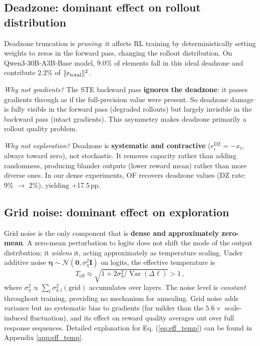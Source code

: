 \documentclass{article}
\theoremstyle{definition}
\theoremstyle{remark}
\DeclareMathOperator{\Var}{Var}
\newcommand{\cN}{\mathcal{N}}
\newcommand{\boldeta}{\bm{\eta}}
\begin{document}
\subsection{Deadzone: dominant effect on rollout distribution}
\label{sec:pathway_reward}

Deadzone truncation is \emph{pruning}: it affects RL training by deterministically setting weights to zeros in the forward pass, changing the rollout distribution. On Qwen3-30B-A3B-Base model, $9.0\%$ of
 elements fall in this ideal deadzone and contribute $2.2\%$ of            
$\|e_{\rm total}\|^2$.

\emph{Why not gradients?} The STE backward pass \textbf{ignores the deadzone}: it passes gradients through as if the full-precision value were present. So deadzone damage is fully visible in the forward pass (degraded rollouts) but largely invisible in the backward pass (intact gradients). This asymmetry makes deadzone primarily a rollout quality problem.

\emph{Why not exploration?} Deadzone is \textbf{systematic and contractive} ($e_i^{\mathrm{DZ}} = -x_i$, always toward zero), not stochastic. It removes capacity rather than adding randomness, producing blander outputs (lower reward mean) rather than more diverse ones. In our dense experiments, OF recovers deadzone values (DZ rate: 9\% $\to$ 2\%), yielding $+$17.5\,pp.

\subsection{Grid noise: dominant effect on exploration}
\label{sec:pathway_exploration}

Grid noise is the only component that is \textbf{dense and approximately zero-mean}. A zero-mean perturbation to logits does not shift the mode of the output distribution; it \emph{widens} it, acting approximately as temperature scaling. Under additive noise $\boldeta \sim \cN(\bm{0}, \sigma_\eta^2\bm{I})$ on logits, the effective temperature is
\begin{equation}
\label{eq:eff_temp}
  T_{\mathrm{eff}} \approx \sqrt{1 + 2\sigma_\eta^2 / \Var(\Delta\ell)} > 1\,,
\end{equation}
where $\sigma_\eta^2 \propto \sum_l \sigma_{\delta,l}^2(\mathrm{grid})$ accumulates over layers. The noise level is \emph{constant} throughout training, providing no mechanism for annealing. Grid noise adds variance but no systematic bias to gradients (far milder than the $5.6\times$ scale-induced fluctuation), and its effect on reward quality averages out over full response sequences. Detailed explanation for Eq. (\ref{eq:eff_temp}) can be found in Appendix \ref{app:eff_temp}.
\end{document}
